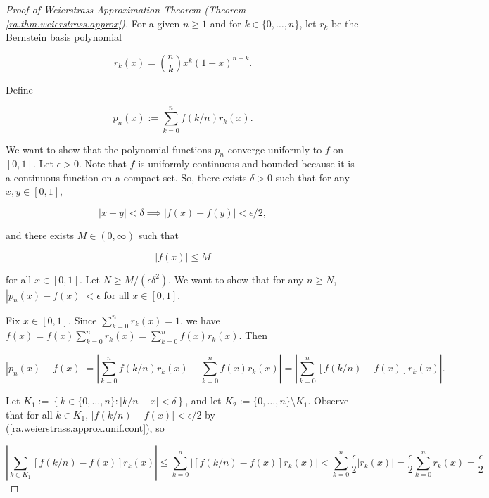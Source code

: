 \begin{proof}[Proof of Weierstrass Approximation Theorem (Theorem \ref{ra.thm.weierstrass.approx})]

For a given \(n \geq 1\) and for \(k \in \{0, \ldots, n\}\), let \(r_k\) be the Bernstein basis polynomial

\[
r_k(x) = \binom{n}{k}x^k (1-x)^{n-k}.
\]

Define

\[
p_n(x) := \sum_{k=0}^n f(k/n) r_k(x).
\]

We want to show that the polynomial functions \(p_n\) converge uniformly to \(f\) on \([0,1]\). Let \(\epsilon > 0\). Note that \(f\) is uniformly continuous and bounded because it is a continuous function on a compact set. So, there exists \(\delta > 0\) such that for any \(x, y \in [0,1]\),

\begin{equation}\label{ra.weierstrass.approx.unif.cont}
|x - y| < \delta \implies | f(x) - f(y)| < \epsilon/2,
\end{equation}

 and there exists \(M \in (0, \infty)\) such that 
 
\begin{equation}\label{ra.weierstrass.approx.bound}
 |f(x)| \leq M
 \end{equation}
 
  for all \(x \in [0,1]\). Let \(N \geq M/(\epsilon \delta^2)\). We want to show that for any \(n \geq N\), \(|p_n(x) - f(x)| < \epsilon\) for all \(x \in [0,1]\).

Fix \(x \in [0,1]\). Since \(\sum_{k=0}^n r_k(x) = 1\), we have \(f(x) = f(x) \sum_{k=0}^n r_k(x)  = \sum_{k=0}^n  f(x)r_k(x) \). Then

\begin{equation}\label{ra.weierstrass.sum.bound}
\left|  p_n(x) - f(x) \right| = \left|   \sum_{k=0}^n f(k/n) r_k(x) - \sum_{k=0}^n  f(x)r_k(x) \right| = \left|   \sum_{k=0}^n \left[ f(k/n) - f(x) \right] r_k(x) \right|.
\end{equation}

Let \(K_1 := \left\{k \in \{0, \ldots,n \} : \left| k/n - x \right| < \delta \right\}\), and let \(K_2 := \{0, \ldots, n\} \setminus K_1\). Observe that for all \(k \in K_1\), \(|f(k/n) - f(x)| < \epsilon/2\) by (\ref{ra.weierstrass.approx.unif.cont}), so

\begin{equation}\label{ra.weierstrass.approx.k1.bound}
 \left|   \sum_{k \in K_1} \left[ f(k/n) - f(x) \right] r_k(x) \right| \leq   \sum_{k =0}^n  \left|   \left[ f(k/n) - f(x) \right] r_k(x) \right| < \sum_{k=0}^n \frac{\epsilon}{2} | r_k(x)| = \frac{\epsilon}{2}  \sum_{k=0}^n r_k(x ) = \frac{\epsilon}{2}
\end{equation}


\end{proof}
